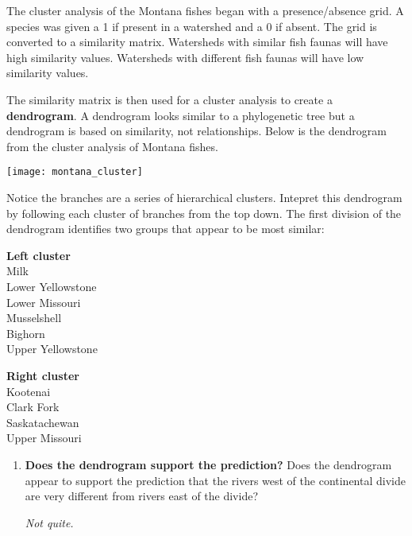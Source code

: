 \documentclass[11pt]{article}
\begin{document}
\newpage

The cluster analysis of the Montana fishes began with a presence/absence
grid. A species was given a 1 if present in a watershed and a 0 if absent. 
The grid is converted to a similarity matrix. Watersheds with similar fish 
faunas will have high similarity values. Watersheds with different
fish faunas will have low similarity values.   

The similarity matrix is then used for a cluster analysis to create a \textbf{dendrogram}.
A dendrogram looks similar to a phylogenetic tree but a dendrogram is based on similarity, not relationships. %
Below is the dendrogram from the cluster analysis of Montana fishes.


	\texttt{[image: montana\_cluster]}

Notice the branches are a series of hierarchical clusters. Intepret this dendrogram
by following each cluster of branches from the top down. The first division of the dendrogram 
identifies two groups that appear to be most similar:

\begin{multicols}{2}
\textbf{Left cluster}\\
Milk\\
Lower Yellowstone\\
Lower Missouri\\
Musselshell\\
Bighorn\\
Upper Yellowstone
\columnbreak

\textbf{Right cluster}\\
Kootenai\\
Clark Fork\\
Saskatachewan\\
Upper Missouri
\end{multicols}

\begin{enumerate}[resume]
\item \textbf{Does the dendrogram support the prediction?} Does the dendrogram appear
to support the prediction that the rivers west of the continental divide are very different
from rivers east of the divide?%

\emph{Not quite.} 
\end{enumerate}
\end{document}
